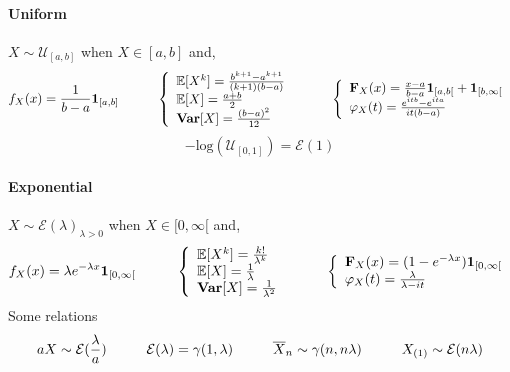 \documentclass[a4paper,10pt]{article}
\begin{document}
\paragraph{Uniform} $X\sim \mathcal{U}_{[a,b]}$ when $X \in [a,b]$ and,
\[
f_{X}(x) = \frac{1}{b-a}\mathbf{1}_{[a,b]}
\hspace{10mm}
\left\{
\begin{array}{l}
\mathbb{E}[X^k]=\frac{b^{k+1}-a^{k+1}}{(k+1)(b-a)} \\
\mathbb{E}[X]=\frac{a+b}{2} \\
\textbf{Var}[X]=\frac{(b-a)^2}{12} 
\end{array}\right.
\hspace{10mm}
\left\{
\begin{array}{l}
\textbf{F}_X(x) = \frac{x-a}{b-a}\mathbf{1}_{[a,b[} + \mathbf{1}_{[b,\infty[} \\
\varphi_{X}(t) = \frac{e^{itb}-e^{ita}}{it(b-a)}
\end{array}\right.
\]
\[
-\text{log}(\mathcal{U}_{[0,1]}) = \mathcal{E}(1)
\]

\paragraph{Exponential} $X\sim \mathcal{E}(\lambda)_{\lambda>0}$ when $X \in [0,\infty[$ and,
\[
f_{X}(x) = \lambda e^{-\lambda x} \mathbf{1}_{[0,\infty[}
\hspace{10mm}
\left\{
\begin{array}{l}
\mathbb{E}[X^k]=\frac{k!}{\lambda^k} \\
\mathbb{E}[X]=\frac{1}{\lambda} \\
\textbf{Var}[X]=\frac{1}{\lambda^2} 
\end{array}\right.
\hspace{10mm}
\left\{
\begin{array}{l}
\textbf{F}_X(x) = (1- e^{-\lambda x})\mathbf{1}_{[0,\infty[} \\
\varphi_{X}(t) = \frac{\lambda}{\lambda - it}
\end{array}\right.
\]
Some relations
\[
aX \sim \mathcal{E}(\frac{\lambda}{a})
\hspace{10mm}
\mathcal{E}(\lambda) = \gamma(1,\lambda)
\hspace{10mm}
\overline{X}_n \sim \gamma(n,n\lambda)
\hspace{10mm}
X_{(1)} \sim \mathcal{E}(n\lambda)
\]
\end{document}
